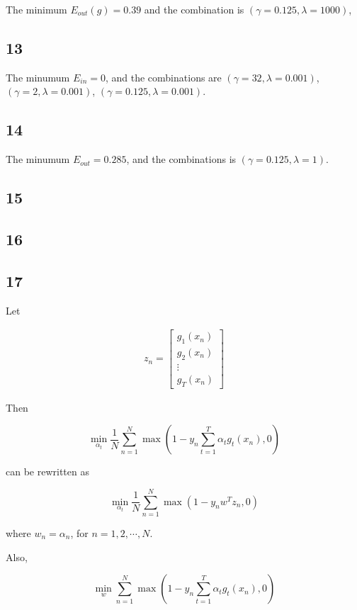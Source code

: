 \documentclass[fleqn,a4paper,12pt]{article}
\begin{document}
The minimum $E_{out}(g) = 0.39$ and the combination is  $(\gamma = 0.125, \lambda = 1000)$,

\subsection*{13}

The minumum $E_{in} = 0$, and the combinations are $(\gamma = 32, \lambda = 0.001)$, $(\gamma = 2, \lambda = 0.001)$, $(\gamma = 0.125, \lambda = 0.001)$.

\subsection*{14}

The minumum $E_{out} = 0.285$, and the combinations is $(\gamma = 0.125, \lambda = 1)$.

\subsection*{15}

\subsection*{16}

\subsection*{17}

Let

\begin{align*}
  z_n = 
  \begin{bmatrix}
    g_1(x_n) \\
    g_2(x_n) \\
    \vdots \\
    g_T(x_n)
  \end{bmatrix}
\end{align*}

Then

$$\min_{\alpha_t} \frac{1}{N} \sum_{n=1}^N \max(1 - y_n \sum_{t=1}^T \alpha_t g_t(x_n), 0)$$

can be rewritten as

$$\min_{\alpha_t} \frac{1}{N} \sum_{n=1}^N \max(1 - y_n w^T z_n, 0)$$

where $w_n = \alpha_n$, for $n = 1, 2, \cdots, N$.

Also,

$$\min_{w} \sum_{n=1}^N \max(1 - y_n \sum_{t=1}^T \alpha_t g_t(x_n), 0)$$
\end{document}
